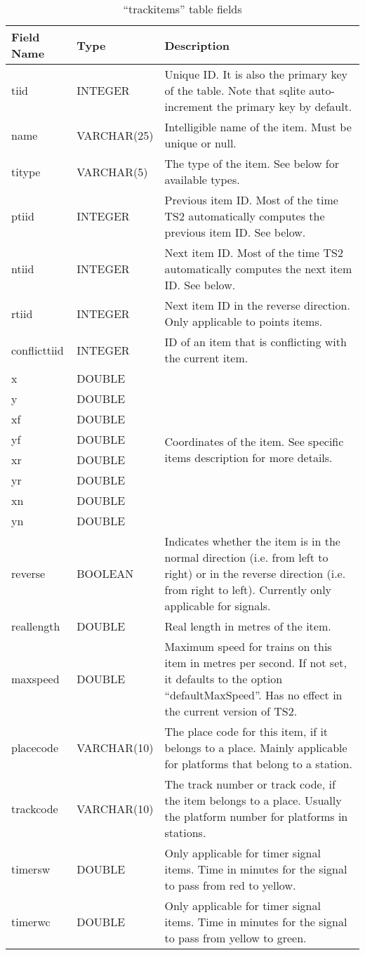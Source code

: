 \documentclass[12pt,a4paper]{article}
\begin{document}
\begin{table}[htbp]
\begin{tabular}{|l|l|p{10cm}|}
\hline
\textbf{Field Name}&\textbf{Type}&\textbf{Description}\\
\hline
tiid&INTEGER&Unique ID. It is also the primary key of the table. Note that sqlite auto-increment the primary key by default.\\
\hline
name&VARCHAR(25)&Intelligible name of the item. Must be unique or null.\\
\hline
titype&VARCHAR(5)&The type of the item. See below for available types.\\
\hline
ptiid&INTEGER&Previous item ID. Most of the time TS2 automatically computes the previous item ID. See below.\\
\hline
ntiid&INTEGER&Next item ID. Most of the time TS2 automatically computes the next item ID. See below.\\
\hline
rtiid&INTEGER&Next item ID in the reverse direction. Only applicable to points items.\\
\hline
conflicttiid&INTEGER&ID of an item that is conflicting with the current item.\\
\hline
x&DOUBLE&\multirow{8}{10cm}{Coordinates of the item. See specific items description for more details.}\\
y&DOUBLE&\\
xf&DOUBLE&\\
yf&DOUBLE&\\
xr&DOUBLE&\\
yr&DOUBLE&\\
xn&DOUBLE&\\
yn&DOUBLE&\\
\hline
reverse&BOOLEAN&Indicates whether the item is in the normal direction (i.e. from left to right) or in the reverse direction (i.e. from right to left). Currently only applicable for signals.\\
\hline
reallength&DOUBLE&Real length in metres of the item.\\
\hline
maxspeed&DOUBLE&Maximum speed for trains on this item in metres per second. If not set, it defaults to the option ``defaultMaxSpeed''. Has no effect in the current version of TS2.\\
\hline
placecode&VARCHAR(10)&The place code for this item, if it belongs to a place. Mainly applicable for platforms that belong to a station.\\
\hline
trackcode&VARCHAR(10)&The track number or track code, if the item belongs to a place. Usually the platform number for platforms in stations.\\
\hline
timersw&DOUBLE&Only applicable for timer signal items. Time in minutes for the signal to pass from red to yellow.\\
\hline
timerwc&DOUBLE&Only applicable for timer signal items. Time in minutes for the signal to pass from yellow to green.\\
\hline
\end{tabular}
\caption{``trackitems'' table fields}
\label{trackitems_fields}
\end{table}
\end{document}

